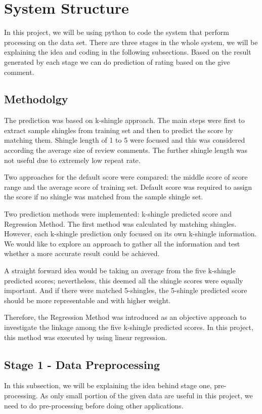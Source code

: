 \section{System Structure}
In this project, we will be using python to code the system that perform processing on the data set. There are three stages in the whole system, we will be explaining the idea and coding in the following subsections. Based on the result generated by each stage we can do prediction of rating based on the give comment.

\subsection{Methodolgy}
The prediction was based on k-shingle approach. The main steps were first to extract sample shingles from training set and then to predict the score by matching them. Shingle length of 1 to 5 were focused and this was considered according the average size of review comments. The further shingle length was not useful due to extremely low repeat rate.

Two approaches for the default score were compared: the middle score of score range and the average score of training set. Default score was required to assign the score if no shingle was matched from the sample shingle set.

Two prediction methods were implemented: k-shingle predicted score and Regression Method. The first method was calculated by matching shingles. However, each k-shingle prediction only focused on its own k-shingle information. We would like to explore an approach to gather all the information and test whether a more accurate result could be achieved.

A straight forward idea would be taking an average from the five k-shingle predicted scores; nevertheless, this deemed all the shingle scores were equally important. And if there were matched 5-shingles, the 5-shingle predicted score should be more representable and with higher weight.

Therefore, the Regression Method was introduced as an objective approach to investigate the linkage among the five k-shingle predicted scores. In this project, this method was executed by using linear regression.

\subsection{Stage 1 - Data Preprocessing}
In this subsection, we will be explaining the idea behind stage one, pre-processing. As only small portion of the given data are useful in this project, we need to do pre-processing before doing other applications.

